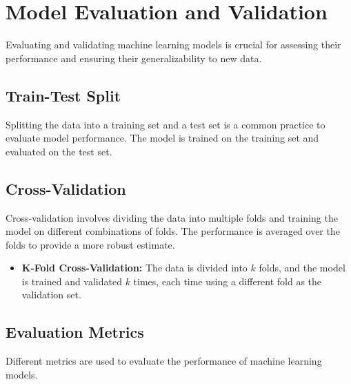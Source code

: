 \section{Model Evaluation and Validation}
Evaluating and validating machine learning models is crucial for assessing their performance and ensuring their generalizability to new data.

\subsection{Train-Test Split}
Splitting the data into a training set and a test set is a common practice to evaluate model performance. The model is trained on the training set and evaluated on the test set.

\subsection{Cross-Validation}
Cross-validation involves dividing the data into multiple folds and training the model on different combinations of folds. The performance is averaged over the folds to provide a more robust estimate.

\begin{itemize}
    \item \textbf{K-Fold Cross-Validation:} The data is divided into \( k \) folds, and the model is trained and validated \( k \) times, each time using a different fold as the validation set.
\end{itemize}

\subsection{Evaluation Metrics}
Different metrics are used to evaluate the performance of machine learning models.

